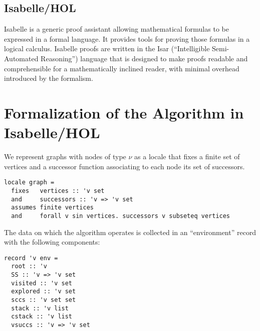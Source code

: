 \documentclass[sigplan,10pt,anonymous,review]{acmart}
\begin{document}
\subsection{Isabelle/HOL}
\label{sec:isabelle}

Isabelle is a generic proof assistant \cite{nipkow_isabellehol_2002} allowing mathematical formulas to be expressed in a formal language.
It provides tools for proving those formulas in a logical calculus.
Isabelle proofs are written in the Isar (``Intelligible Semi-Automated Reasoning'') language that is designed to make proofs readable and comprehensible for a mathematically inclined reader, with minimal overhead introduced by the formalism.



\section{Formalization of the Algorithm in Isabelle/HOL}
\label{sec:formalization}

We represent graphs with nodes of type $\nu$ as a locale that fixes a finite set of vertices and a successor function associating to each node its set of successors.

\begin{small}
\begin{lstlisting}[language=isabelle]
locale graph =
  fixes   vertices :: 'v set
  and     successors :: 'v => 'v set
  assumes finite vertices  
  and     forall v sin vertices. successors v subseteq vertices
\end{lstlisting}
\end{small}

The data on which the algorithm operates is collected in an ``environment'' record with the following components:

\begin{small}
\begin{lstlisting}[language=isabelle]
record 'v env =
  root :: 'v
  SS :: 'v => 'v set
  visited :: 'v set
  explored :: 'v set
  sccs :: 'v set set
  stack :: 'v list
  cstack :: 'v list
  vsuccs :: 'v => 'v set
\end{lstlisting}
\end{small}
\end{document}
